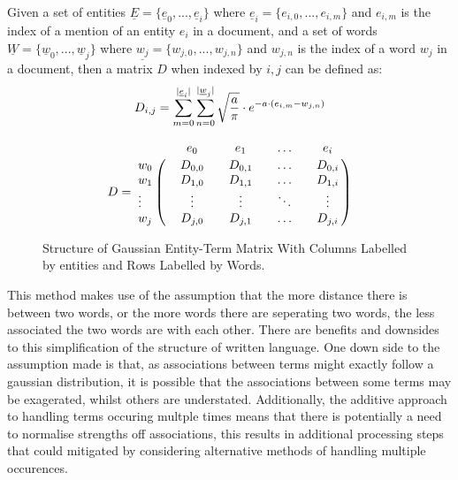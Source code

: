 \documentclass[10pt]{report}
\begin{document}
Given a set of entities \(\underline{E} = \{\underline{e}_0, ..., \underline{e}_i\}\) where \(\underline{e}_i = \{e_{i,0}, ..., e_{i,m}\}\) and $e_{i,m}$ is the index of a mention of an entity $e_i$ in a document, and a set of words \(\underline{W}=\{\underline{w}_0, ..., \underline{w}_j\}\) where $\underline{w_j} = \{w_{j,0}, ..., w_{j,n}\}$ and $w_{j,n}$ is the index of a word $w_j$ in a document, then a matrix \(D\) when indexed by \(i,j\) can be defined as:
\[
  D_{i,j}= \sum^{|\underline{e}_i|}_{m=0}\sum^{|\underline{w}_j|}_{n=0}\sqrt{a\over{\pi}}\cdot e^{-a\cdot(e_{i,m} - w_{j,n})}
\]
\begin{figure}
  \centering
\[
  D =
  \bordermatrix{&&e_0 && e_1 &&\hdots && e_i\cr
    w_0 && D_{0,0} && D_{0,1} && \hdots && D_{0,i}\cr
    w_1 && D_{1,0} && D_{1,1} && \hdots && D_{1,i}\cr
    \vdots && \vdots && \vdots && \ddots && \vdots\cr
    w_j && D_{j,0} && D_{j,1} && \hdots && D_{j,i}
  }
\]
\caption{Structure of Gaussian Entity-Term Matrix With Columns Labelled by entities and Rows Labelled by Words.\label{fig:getm_matrix_calc.}}
\end{figure}

This method makes use of the assumption that the more distance there is between two words, or the more words there are seperating two words, the less associated the two words are with each other. There are benefits and downsides to this simplification of the structure of written language. One down side to the assumption made is that, as associations between terms might exactly follow a gaussian distribution, it is possible that the associations between some terms may be exagerated, whilst others are understated. Additionally, the additive approach to handling terms occuring multple times means that there is potentially a need to normalise strengths off associations, this results in additional processing steps that could mitigated by considering alternative methods of handling multiple occurences.
\end{document}
